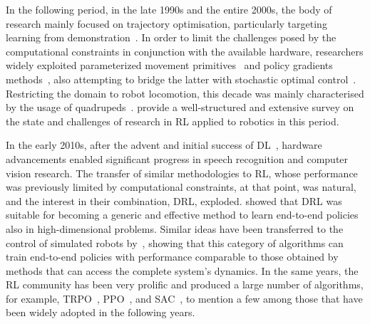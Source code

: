 In the following period, in the late 1990s and the entire 2000s, the body of research mainly focused on trajectory optimisation, particularly targeting learning from demonstration~\parencite{schaal_learning_1996,  atkeson_robot_1997, schaal_is_1999}.
In order to limit the challenges posed by the computational constraints in conjunction with the available hardware, researchers widely exploited parameterized movement primitives~\parencite{schaal_dynamic_2006} and policy gradients methods~\parencite{peters_reinforcement_2003, peters_policy_2006, kober_policy_2008}, also attempting to bridge the latter with stochastic optimal control~\parencite{theodorou_generalized_2010}.
Restricting the domain to robot locomotion, this decade was mainly characterised by the usage of quadrupeds~\parencite{kohl_policy_2004, honglak_lee_quadruped_2006, kolter_hierarchical_2007, theodorou_reinforcement_2010}.
\textcite{koberReinforcementLearningRobotics2013} provide a well-structured and extensive survey on the state and challenges of research in \ac{RL} applied to robotics in this period.

In the early 2010s, after the advent and initial success of \ac{DL}~\parencite{hinton_fast_2006}, hardware advancements enabled significant progress in speech recognition and computer vision research.
The transfer of similar methodologies to \ac{RL}, whose performance was previously limited by computational constraints, at that point, was natural, and the interest in their combination, \ac{DRL}, exploded.
\textcite{mnih_human-level_2015} showed that \ac{DRL} was suitable for becoming a generic and effective method to learn end-to-end policies also in high-dimensional problems.
Similar ideas have been transferred to the control of simulated robots by~\textcite{lillicrap_continuous_2016}, showing that this category of algorithms can train end-to-end policies with performance comparable to those obtained by methods that can access the complete system's dynamics.
In the same years, the \ac{RL} community has been very prolific and produced a large number of algorithms, for example, \ac{TRPO}~\parencite{schulman_trust_2017}, \ac{PPO}~\parencite{schulman_proximal_2017}, and \ac{SAC}~\parencite{haarnoja_soft_2018}, to mention a few among those that have been widely adopted in the following years.

